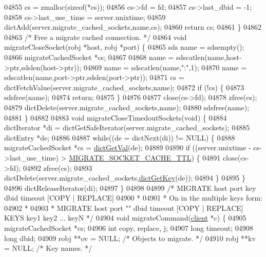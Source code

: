 \begin{DoxyCode}
{{{{{{{{{{{{{{{{{{{{{{{{{{{{{{{{{{{{{{{{{{{{{{{{{{{{{{{{{{{{{{{{{{{{{{{{{{{{{{{{{{{{{{{{{{{{{{{{{{{{{{{{{{{04855     cs = zmalloc(\textcolor{keyword}{sizeof}(*cs));
04856     cs->fd = fd;
04857     cs->last\_dbid = -1;
04858     cs->last\_use\_time = server.unixtime;
04859     dictAdd(server.migrate\_cached\_sockets,name,cs);
04860     \textcolor{keywordflow}{return} cs;
04861 \}
04862 
04863 \textcolor{comment}{/* Free a migrate cached connection. */}
04864 \textcolor{keywordtype}{void} migrateCloseSocket(robj *host, robj *port) \{
04865     sds name = sdsempty();
04866     migrateCachedSocket *cs;
04867 
04868     name = sdscatlen(name,host->ptr,sdslen(host->ptr));
04869     name = sdscatlen(name,\textcolor{stringliteral}{":"},1);
04870     name = sdscatlen(name,port->ptr,sdslen(port->ptr));
04871     cs = dictFetchValue(server.migrate\_cached\_sockets,name);
04872     \textcolor{keywordflow}{if} (!cs) \{
04873         sdsfree(name);
04874         \textcolor{keywordflow}{return};
04875     \}
04876 
04877     close(cs->fd);
04878     zfree(cs);
04879     dictDelete(server.migrate\_cached\_sockets,name);
04880     sdsfree(name);
04881 \}
04882 
04883 \textcolor{keywordtype}{void} migrateCloseTimedoutSockets(\textcolor{keywordtype}{void}) \{
04884     dictIterator *di = dictGetSafeIterator(server.migrate\_cached\_sockets);
04885     dictEntry *de;
04886 
04887     \textcolor{keywordflow}{while}((de = dictNext(di)) != NULL) \{
04888         migrateCachedSocket *cs = \hyperlink{dict_8h_ae8d2cc391873b2bea2b87c4f80f43120}{dictGetVal}(de);
04889 
04890         \textcolor{keywordflow}{if} ((server.unixtime - cs->last\_use\_time) > 
      \hyperlink{cluster_8c_ad338d1ae62fe93944193ff175f6d6526}{MIGRATE\_SOCKET\_CACHE\_TTL}) \{
04891             close(cs->fd);
04892             zfree(cs);
04893             dictDelete(server.migrate\_cached\_sockets,\hyperlink{dict_8h_a3271c334309904a3086deca94f96e46e}{dictGetKey}(de));
04894         \}
04895     \}
04896     dictReleaseIterator(di);
04897 \}
04898 
04899 \textcolor{comment}{/* MIGRATE host port key dbid timeout [COPY | REPLACE]}
04900 \textcolor{comment}{ *}
04901 \textcolor{comment}{ * On in the multiple keys form:}
04902 \textcolor{comment}{ *}
04903 \textcolor{comment}{ * MIGRATE host port "" dbid timeout [COPY | REPLACE] KEYS key1 key2 ... keyN */}
04904 \textcolor{keywordtype}{void} migrateCommand(\hyperlink{structclient}{client} *c) \{
04905     migrateCachedSocket *cs;
04906     \textcolor{keywordtype}{int} copy, replace, j;
04907     \textcolor{keywordtype}{long} timeout;
04908     \textcolor{keywordtype}{long} dbid;
04909     robj **ov = NULL; \textcolor{comment}{/* Objects to migrate. */}
04910     robj **kv = NULL; \textcolor{comment}{/* Key names. */}
}}}}}}}}}}}}}}}}}}}}}}}}}}}}}}}}}}}}}}}}}}}}}}}}}}}}}}}}}}}}}}}}}}}}}}}}}}}}}}}}}}}}}}}}}}}}}}}}}}}}}}}}}}}
\end{DoxyCode}
